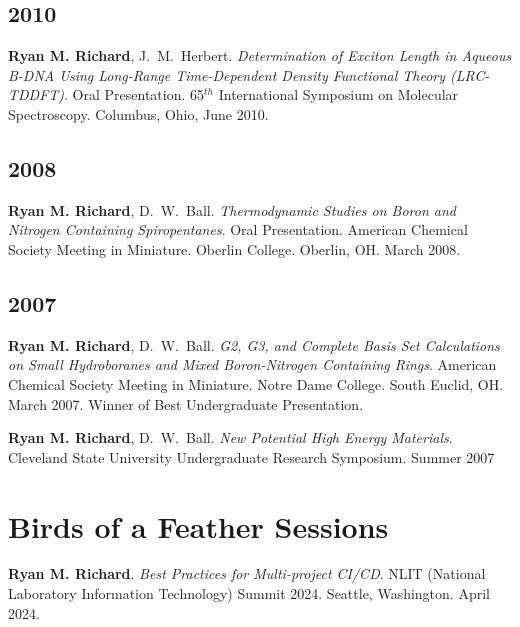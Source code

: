 \documentclass[11pt,a4paper,sans]{moderncv}
\begin{document}
\begin{etaremune}
	\subsection{2010}
	\item{\textbf{Ryan M. Richard}, J.~M.~Herbert.  {\em Determination of 
	      Exciton Length in Aqueous B-DNA Using Long-Range Time-Dependent 
		  Density Functional Theory (LRC-TDDFT)}.  Oral Presentation.  
		  65$^{th}$ International Symposium on Molecular Spectroscopy.  
		  Columbus, Ohio, June 2010.}

	\subsection{2008}
	\item{\textbf{Ryan M. Richard}, D.~W.~Ball.\textit{ Thermodynamic Studies on
		  Boron and Nitrogen Containing Spiropentanes}. Oral Presentation.  
		  American Chemical Society Meeting in Miniature. Oberlin College. 
		  Oberlin, OH.  March 2008.}

	\subsection{2007}
	\item{\textbf{Ryan M. Richard}, D.~W.~Ball. \textit{G2, G3, and Complete 
	      Basis Set Calculations on Small Hydroboranes and Mixed Boron-Nitrogen
		  Containing Rings}. American Chemical Society Meeting in Miniature. 
		  Notre Dame College. South Euclid, OH.  March 2007. Winner of Best 
		  Undergraduate Presentation.}
	\item{\textbf{Ryan M. Richard}, D.~W.~Ball. \textit{New Potential High 
	      Energy Materials}. Cleveland State University Undergraduate Research 
		  Symposium. Summer 2007}
\end{etaremune}

\section{Birds of a Feather Sessions}
\begin{etaremune}
	\item{\textbf{Ryan M. Richard}. \emph{Best Practices for Multi-project 
	      CI/CD}. NLIT (National Laboratory Information Technology) Summit 2024. 
		  Seattle, Washington. April 2024.}	
\end{etaremune}
\end{document}
